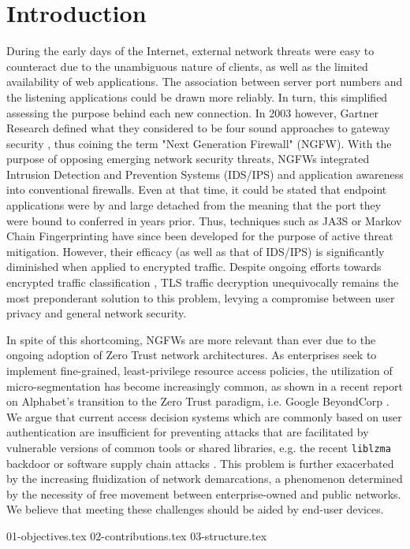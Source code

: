 
\chapter{Introduction}
\label{intro:chapter}

During the early days of the Internet, external network threats were easy to counteract due to the unambiguous nature of clients, as well as the limited availability of web applications. The association between server port numbers and the listening applications could be drawn more reliably. In turn, this simplified assessing the purpose behind each new connection. In 2003 however, Gartner Research defined what they considered to be four sound approaches to gateway security \cite{stiennon2003paths}, thus coining the term "Next Generation Firewall" (NGFW). With the purpose of opposing emerging network security threats, NGFWs integrated Intrusion Detection and Prevention Systems (IDS/IPS) and application awareness \cite{heino2022study} into conventional firewalls. Even at that time, it could be stated that endpoint applications were by and large detached from the meaning that the port they were bound to conferred in years prior. Thus, techniques such as JA3S or Markov Chain Fingerprinting \cite{gancheva2020tls} have since been developed for the purpose of active threat mitigation. However, their efficacy (as well as that of IDS/IPS) is significantly diminished when applied to encrypted traffic. Despite ongoing efforts towards encrypted traffic classification \cite{akbari2021look,yun2022encrypted,zhang2019stnn}, TLS traffic decryption \cite{radivilova2018decrypting} unequivocally remains the most preponderant solution to this problem, levying a compromise between user privacy and general network security.

In spite of this shortcoming, NGFWs are more relevant than ever due to the ongoing adoption of Zero Trust \cite{stafford2020zero} network architectures.
As enterprises seek to implement fine-grained, least-privilege resource access policies, the utilization of micro-segmentation \cite{basta2022towards} has become increasingly common, as shown in a recent report \cite{gonccalves2023beyondcorp} on Alphabet's transition to the Zero Trust paradigm, i.e. Google BeyondCorp \cite{ward2014beyondcorp,osborn2016beyondcorp}. We argue that current access decision systems which are commonly based on user authentication are insufficient for preventing attacks that are facilitated by vulnerable versions of common tools or shared libraries, e.g. the recent \texttt{liblzma} backdoor or software supply chain attacks \cite{ohm2020backstabber}. This problem is further exacerbated by the increasing fluidization of network demarcations, a phenomenon determined by the necessity of free movement between enterprise-owned and public networks. We believe that meeting these challenges should be aided by end-user devices.


{01-objectives.tex}
{02-contributions.tex}
{03-structure.tex}


